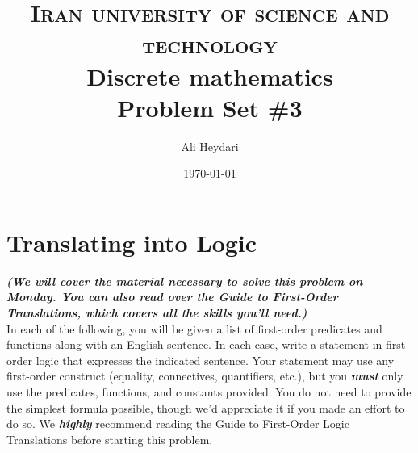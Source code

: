\documentclass[a4paper]{article}
\title{
\textsc{Iran university of science and technology} \\ [25pt] %
Discrete mathematics\\Problem Set \#3 \\
}
\author{Ali Heydari}
\date{\today}
\renewcommand{\(}{\left(}
\renewcommand{\)}{\right)}
\theoremstyle{plain}
\theoremstyle{plain}
\theoremstyle{definition}
\begin{document}
\maketitle

\tableofcontents

\section{Translating into Logic}
\textit{\textbf{(We will cover the material necessary to solve this problem on Monday. You can also read over the Guide to
First-Order Translations, which covers all the skills you'll need.)}} \\

In each of the following,
you will be given a list of first-order predicates and functions
along with an English sentence.
In each case,
write a statement in first-order logic that expresses
the indicated sentence.
Your statement may use any first-order construct
(equality, connectives, quantifiers, etc.),
but you \textbf{\textit{must}} only use the predicates, functions,
and constants provided.
You do not need to provide the simplest formula
possible, though we'd appreciate it if you made an effort to do so. We \textit{\textbf{highly}} recommend reading the
Guide to First-Order Logic Translations before starting this problem.
\end{document}
